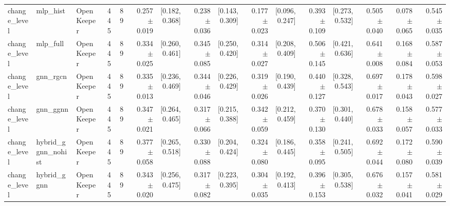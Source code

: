 \begin{table}[htbp]
{\begin{tabular}{lllrrrrrrrrrrrrr}
change\_level & mlp\_hist & OpenKeeper & 445 & 89 & 0.257 $\pm$ 0.019 & [0.182, 0.368] & 0.238 $\pm$ 0.036 & [0.143, 0.309] & 0.177 $\pm$ 0.023 & [0.096, 0.247] & 0.393 $\pm$ 0.109 & [0.273, 0.532] & 0.505 $\pm$ 0.040 & 0.078 $\pm$ 0.065 & 0.545 $\pm$ 0.035 \\
change\_level & mlp\_full & OpenKeeper & 445 & 89 & 0.334 $\pm$ 0.025 & [0.260, 0.461] & 0.345 $\pm$ 0.085 & [0.250, 0.420] & 0.314 $\pm$ 0.027 & [0.208, 0.409] & 0.506 $\pm$ 0.145 & [0.421, 0.636] & 0.641 $\pm$ 0.008 & 0.168 $\pm$ 0.084 & 0.587 $\pm$ 0.053 \\
change\_level & gnn\_rgcn & OpenKeeper & 445 & 89 & 0.335 $\pm$ 0.013 & [0.236, 0.469] & 0.344 $\pm$ 0.046 & [0.226, 0.429] & 0.319 $\pm$ 0.026 & [0.190, 0.439] & 0.440 $\pm$ 0.127 & [0.328, 0.543] & 0.697 $\pm$ 0.017 & 0.178 $\pm$ 0.043 & 0.598 $\pm$ 0.027 \\
change\_level & gnn\_ggnn & OpenKeeper & 445 & 89 & 0.347 $\pm$ 0.021 & [0.264, 0.465] & 0.317 $\pm$ 0.066 & [0.215, 0.388] & 0.342 $\pm$ 0.059 & [0.212, 0.459] & 0.370 $\pm$ 0.130 & [0.301, 0.440] & 0.678 $\pm$ 0.033 & 0.158 $\pm$ 0.057 & 0.577 $\pm$ 0.033 \\
change\_level & hybrid\_ggnn\_nohist & OpenKeeper & 445 & 89 & 0.377 $\pm$ 0.058 & [0.265, 0.518] & 0.330 $\pm$ 0.088 & [0.204, 0.424] & 0.324 $\pm$ 0.080 & [0.186, 0.445] & 0.358 $\pm$ 0.095 & [0.241, 0.505] & 0.692 $\pm$ 0.044 & 0.172 $\pm$ 0.080 & 0.590 $\pm$ 0.039 \\
change\_level & hybrid\_ggnn & OpenKeeper & 445 & 89 & 0.343 $\pm$ 0.020 & [0.256, 0.475] & 0.317 $\pm$ 0.082 & [0.223, 0.395] & 0.304 $\pm$ 0.035 & [0.192, 0.413] & 0.396 $\pm$ 0.153 & [0.305, 0.538] & 0.676 $\pm$ 0.032 & 0.157 $\pm$ 0.041 & 0.581 $\pm$ 0.029 \\
\bottomrule
\end{tabular}}
\end{table}
